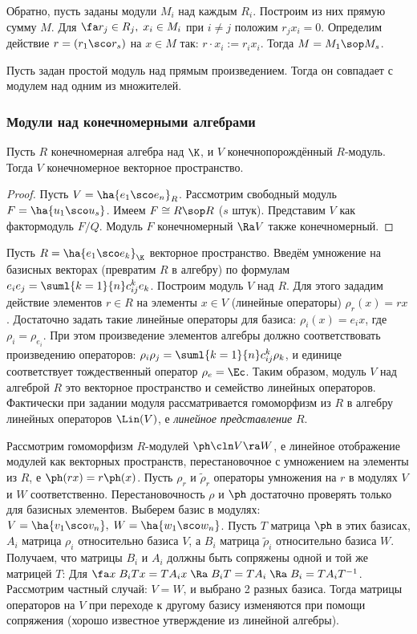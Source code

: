 \documentclass[a4paper]{article}
\begin{document}
Обратно, пусть заданы модули $M_i$ над каждым $R_i$. Построим из них прямую сумму $M$. Для $\fa r_j \in R_j, \; x_i \in M_i$ при $i \neq j$ положим
$r_j x_i=0$. Определим действие $r=(r_1 \sco r_s)$ на $x \in M$ так: $r \cdot x_i := r_i x_i$. Тогда $M=M_1 \sop M_s$.

\begin{imp}
Пусть задан простой модуль над прямым произведением. Тогда он совпадает с модулем над одним из множителей.
\end{imp}

\subsubsection{Модули над конечномерными алгебрами}

\begin{stm}
Пусть $R$ конечномерная алгебра над $\K$, и $V$ конечнопорождённый $R$-модуль. Тогда $V$
конечномерное векторное пространство.
\end{stm}
\begin{proof}
Пусть $V=\ha{e_1 \sco e_n}_R$. Рассмотрим свободный модуль $F=\ha{u_1 \sco u_s}$. Имеем  $F \cong R \sop R$
($s$ штук). Представим $V$ как фактормодуль $F/Q$. Модуль $F$ конечномерный $\Ra V$ также
конечномерный.
\end{proof}

Пусть $R=\ha{e_1 \sco e_k}_\K$ векторное пространство. Введём умножение на базисных векторах  (превратим
$R$ в алгебру) по формулам $e_i e_j = \suml{k=1}{n}c_{ij}^k e_k$. Построим модуль $V$ над $R$. Для этого
зададим действие элементов $r \in R$ на элементы $x \in V$ (линейные операторы) $\rho_r(x) = rx$. Достаточно
задать такие линейные операторы для базиса: $\rho_i(x)=e_i x$, где $\rho_i = \rho_{e_i}$. При этом
произведение элементов алгебры должно соответствовать произведению операторов: $\rho_i\rho_j =
\suml{k=1}{n}c_{ij}^k\rho_k$, и единице соответствует тождественный оператор $\rho_e = \Ec$. Таким образом,
модуль $V$ над алгеброй $R$ это векторное пространство и семейство линейных операторов. Фактически при
задании модуля рассматривается гомоморфизм из $R$ в алгебру линейных операторов $\Lin(V)$, е
\emph{линейное представление} $R$.

Рассмотрим гомоморфизм $R$-модулей $\ph\cln V \ra W$, е линейное отображение модулей как векторных
пространств, перестановочное с умножением на элементы из $R$, е $\ph(rx)=r\ph(x)$. Пусть $\rho_r$ и
$\widetilde{\rho}_r$ операторы умножения на $r$ в модулях $V$ и $W$ соответственно. Перестановочность
$\rho$ и $\ph$ достаточно проверять только для базисных элементов. Выберем базис в модулях: $V=\ha{v_1 \sco
v_n}, \; W=\ha{w_1 \sco w_n}$. Пусть $T$ матрица $\ph$ в этих базисах, $A_i$ матрица $\rho_i$
относительно базиса $V$, а $B_i$ матрица $\widetilde{\rho}_i$ относительно базиса $W$. Получаем, что
матрицы $B_i$ и $A_i$ должны быть сопряжены одной и той же матрицей $T$: Для $\fa x \; B_i T x = T A_i x \;
\Ra \; B_i T = TA_i \; \Ra \; B_i = TA_iT^{-1}$. Рассмотрим частный случай: $V=W$, и выбрано 2 разных базиса.
Тогда матрицы операторов на $V$ при переходе к другому базису изменяются при помощи сопряжения (хорошо
известное утверждение из линейной алгебры).
\end{document}
